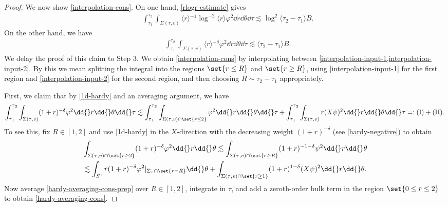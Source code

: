 \documentclass[10pt, reqno]{amsart}
\begin{document}
\begin{proof}
We now show \cref{interpolation-cons}. On one hand, \cref{rlogr-estimate} gives
\begin{equation}\label{interpolation-input-1}
\begin{split}
&\int_{\tau{}_1}^{\tau{}_2} \int _{\Sigma{}(\tau{},v)}\langle{}r\rangle{}^{-1}\log ^{-2}\langle{}r\rangle{}\varphi^2\dd{}r\dd{}\theta{}\dd{}\tau{} \lesssim \log^2\langle{}\tau{}_2-\tau{}_1\rangle{}B.
\end{split}
\end{equation}
On the other hand, we have
\begin{equation}\label{interpolation-input-2}
\begin{split}
&\int_{\tau{}_1}^{\tau{}_2} \int _{\Sigma{}(\tau{},v)} \langle{}r\rangle{}^{-\delta{}}\varphi^2\dd{}r\dd{}\theta{}\dd{}\tau{}\lesssim \langle{}\tau{}_2-\tau{}_1\rangle{}B.
\end{split}
\end{equation}
We delay the proof of this claim to Step 3. We obtain \cref{interpolation-cons} by
interpolating between \cref{interpolation-input-1,interpolation-input-2}. By this
we mean splitting the integral into the regions \(\set{r\le R}\) and \(\set{r\ge
R}\), using \cref{interpolation-input-1} for the first region and
\cref{interpolation-input-2} for the second region, and then choosing \(R\sim
\tau{}_2-\tau{}_1\) appropriately.

 First, we claim that by \cref{1d-hardy} and an averaging
argument, we have
\begin{equation}\label{hardy-averaging-cons}
\int_{\tau{}_1}^{\tau{}_2} \int _{\Sigma{}(\tau{},v)} (1+r)^{-\delta{}}\varphi^2\dd{}r\dd{}\theta{}\dd{}\tau{}\lesssim \int_{\tau{}_1}^{\tau{}_2} \int _{\Sigma{}(\tau{},v)\cap \set{r\le 2}} \varphi^2\dd{}r\dd{}\theta{}\dd{}\tau{} + \int_{\tau{}_1}^{\tau{}_2}\int _{\Sigma{}(\tau{},v)} r(X\psi{})^2\dd{}r\dd{}\theta{}\dd{}\tau{} =: \textnormal{(I)} + \textnormal{(II)}. \\
\end{equation}
To see this, fix \(R\in [1,2]\) and use \cref{1d-hardy} in the \(X\)-direction with
the decreasing weight \((1 + r)^{-\delta{}}\) (see \cref{hardy-negative}) to obtain
\begin{equation}\label{hardy-averaging-cons-prep}
\begin{split}
&\int _{\Sigma{}(\tau{},v)\cap \set{r\ge 2}}(1+r)^{-\delta{}}\varphi^2\dd{}r\dd{}\theta{}\lesssim \int _{\Sigma{}(\tau{},v)\cap \set{r\ge R}}(1+r)^{-1-\delta{}}\psi{}^2\dd{}r\dd{}\theta{} \\
&\lesssim \int _{S^1}r(1+r)^{-\delta{}}\varphi^2|_{\Sigma{}_\tau{}\cap \set{r=R}}\dd{}\theta{} + \int _{\Sigma{}(\tau{},v)\cap \set{r\ge 1}}(1+r)^{1-\delta{}}(X\psi{})^2\dd{}r\dd{}\theta{}.
\end{split}
\end{equation}
Now average \cref{hardy-averaging-cons-prep} over \(R\in [1,2]\), integrate in
\(\tau{}\), and add a zeroth-order bulk term in the region \(\set{0\le r\le 2}\)
to obtain \cref{hardy-averaging-cons}.


\end{proof}
\end{document}
